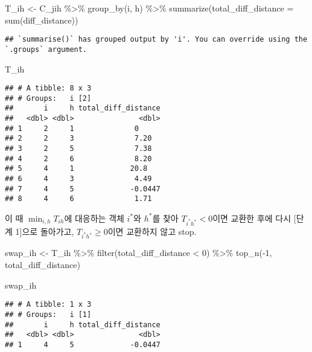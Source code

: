 \documentclass[
]{book}
\newenvironment{Shaded}{\begin{snugshade}}{\end{snugshade}}
\newcommand{\AttributeTok}[1]{\textcolor[rgb]{0.77,0.63,0.00}{#1}}
\newcommand{\DecValTok}[1]{\textcolor[rgb]{0.00,0.00,0.81}{#1}}
\newcommand{\FunctionTok}[1]{\textcolor[rgb]{0.00,0.00,0.00}{#1}}
\newcommand{\NormalTok}[1]{#1}
\newcommand{\OtherTok}[1]{\textcolor[rgb]{0.56,0.35,0.01}{#1}}
\newcommand{\SpecialCharTok}[1]{\textcolor[rgb]{0.00,0.00,0.00}{#1}}
\begin{document}
\begin{Shaded}
\begin{Highlighting}[]
\NormalTok{T\_ih }\OtherTok{\textless{}{-}}\NormalTok{ C\_jih }\SpecialCharTok{\%\textgreater{}\%}
  \FunctionTok{group\_by}\NormalTok{(i, h) }\SpecialCharTok{\%\textgreater{}\%}
  \FunctionTok{summarize}\NormalTok{(}\AttributeTok{total\_diff\_distance =} \FunctionTok{sum}\NormalTok{(diff\_distance))}
\end{Highlighting}
\end{Shaded}

\begin{verbatim}
## `summarise()` has grouped output by 'i'. You can override using the `.groups` argument.
\end{verbatim}

\begin{Shaded}
\begin{Highlighting}[]
\NormalTok{T\_ih}
\end{Highlighting}
\end{Shaded}

\begin{verbatim}
## # A tibble: 8 x 3
## # Groups:   i [2]
##       i     h total_diff_distance
##   <dbl> <dbl>               <dbl>
## 1     2     1              0     
## 2     2     3              7.20  
## 3     2     5              7.38  
## 4     2     6              8.20  
## 5     4     1             20.8   
## 6     4     3              4.49  
## 7     4     5             -0.0447
## 8     4     6              1.71
\end{verbatim}

이 때 \(\min_{i, h} T_{ih}\)에 대응하는 객체 \(i^*\)와 \(h^*\)를 찾아 \(T_{i^*h^*} < 0\)이면 교환한 후에 다시 {[}단계 1{]}으로 돌아가고, \(T_{i^*h^*} \geq 0\)이면 교환하지 않고 stop.

\begin{Shaded}
\begin{Highlighting}[]
\NormalTok{swap\_ih }\OtherTok{\textless{}{-}}\NormalTok{ T\_ih }\SpecialCharTok{\%\textgreater{}\%}
  \FunctionTok{filter}\NormalTok{(total\_diff\_distance }\SpecialCharTok{\textless{}} \DecValTok{0}\NormalTok{) }\SpecialCharTok{\%\textgreater{}\%}
  \FunctionTok{top\_n}\NormalTok{(}\SpecialCharTok{{-}}\DecValTok{1}\NormalTok{, total\_diff\_distance)}

\NormalTok{swap\_ih}
\end{Highlighting}
\end{Shaded}

\begin{verbatim}
## # A tibble: 1 x 3
## # Groups:   i [1]
##       i     h total_diff_distance
##   <dbl> <dbl>               <dbl>
## 1     4     5             -0.0447
\end{verbatim}
\end{document}

